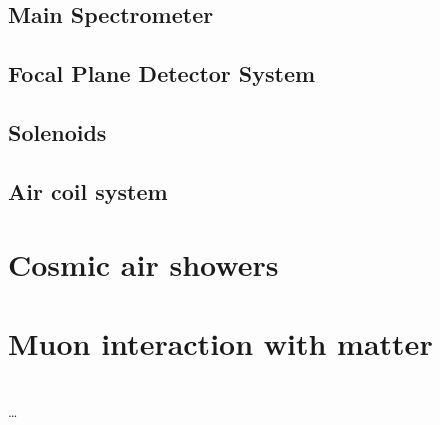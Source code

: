       \subsection{Main Spectrometer}
      \label{ch:Introduction:sec:The KATRIN experiment:subsec:macE}
      
      \subsection{Focal Plane Detector System}
      \label{ch:Introduction:sec:The KATRIN experiment:subsec:mainDetectorSystem}
      
      \subsection{Solenoids}
      \label{ch:Introduction:sec:The KATRIN experiment:subsec:solenoids}
      
      \subsection{Air coil system}
      \label{ch:Introduction:sec:The KATRIN experiment:subsec:Air coil system}
      
      \subsection{}
      \label{ch:Introduction:sec:The KATRIN experiment:subsec:}
      

    \section{Cosmic air showers}
    \label{ch:Introduction:sec:Cosmic air showers}

    \section{Muon interaction with matter}
    \label{ch:Introduction:sec:Muon interaction with matter}

    \section{}

\cite{becker2008a}
\dots

